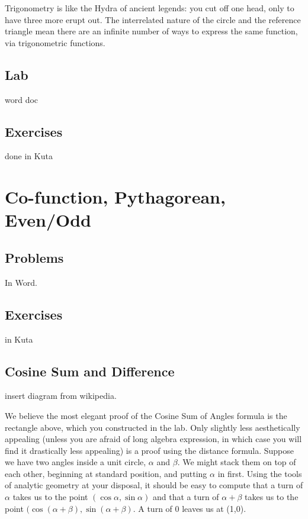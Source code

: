 


Trigonometry is like the Hydra of ancient legends: you cut off one head, only to have
three more erupt out.  The interrelated nature of the circle and the reference triangle
mean there are an infinite number of ways to express the same function, via
trigonometric functions.


\newpage
\chapterminitoc


\newpage
{}
\subsection{Lab}
word doc

\newpage
\subsection{Exercises}
done in Kuta


\newpage
\section{Co-function, Pythagorean, Even/Odd}
\subsection{Problems}
In Word.
\newpage

\newpage
\subsection{Exercises}
in Kuta


\newpage
{}
\newpage
\subsection{Cosine Sum and Difference}
insert diagram from wikipedia.

We believe the most elegant proof of the Cosine Sum of Angles formula is the
rectangle above, which you constructed in the lab.  Only slightly less aesthetically appealing
(unless you are afraid of long algebra expression, in which case you will find it drastically
less appealing) is a proof using the distance formula.  Suppose we have two angles inside
a unit circle, $\alpha$ and $\beta$.  We might stack them on top of each other, beginning at
standard position, and putting $\alpha$ in first.  Using the tools of analytic geometry at your
disposal, it should be easy to compute that a turn of $\alpha$ takes us to the point
$(\cos\alpha, \sin\alpha)$ and that a turn of $\alpha+\beta$ takes us to the point 
$(\cos(\alpha+\beta), \sin(\alpha+\beta)$.  A turn of 0 leaves us at (1,0).

